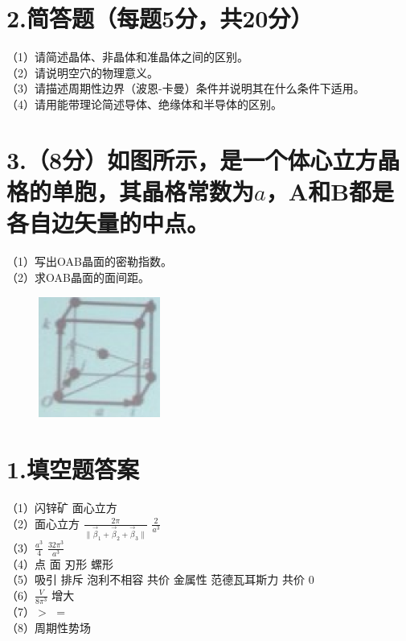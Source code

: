 \documentclass[UTF8]{ctexart}
\begin{document}
\section*{\bfseries 2.简答题（每题5分，共20分）}
（1）请简述晶体、非晶体和准晶体之间的区别。\\
（2）请说明空穴的物理意义。\\
（3）请描述周期性边界（波恩-卡曼）条件并说明其在什么条件下适用。\\
（4）请用能带理论简述导体、绝缘体和半导体的区别。\\
\section*{\bfseries 3.（8分）如图所示，是一个体心立方晶格的单胞，其晶格常数为$a$，A和B都是各自边矢量的中点。}
（1）写出OAB晶面的密勒指数。\\
（2）求OAB晶面的面间距。\\
\begin{figure}[H]
    \centering
    \includegraphics[width=4cm,height=4cm]{3.png}
\end{figure}
\newpage
\section*{\bfseries 1.填空题答案}
（1）闪锌矿\makebox[2em]{}
面心立方\\
（2）面心立方\makebox[2em]{}
$\frac{2\pi}{\lVert\vec\beta_1+\vec\beta_2+\vec\beta_3\rVert}$\makebox[2em]{}
$\frac{2}{a^3}$\\
（3）$\frac{a^3}{4}$\makebox[2em]{}
$\frac{32\pi^3}{a^3}$\\
（4）点\makebox[2em]{}
面\makebox[2em]{}
刃形\makebox[2em]{}
螺形\\
（5）吸引\makebox[2em]{}
排斥\makebox[2em]{}
泡利不相容\makebox[2em]{}
共价\makebox[2em]{}
金属性\makebox[2em]{}
范德瓦耳斯力\makebox[2em]{}
共价\makebox[2em]{}
0\\
（6）$\frac{V}{8\pi^3}$\makebox[2em]{}
增大\\
（7）$>$\makebox[2em]{}
$=$\\
（8）周期性势场\\
\end{document}

